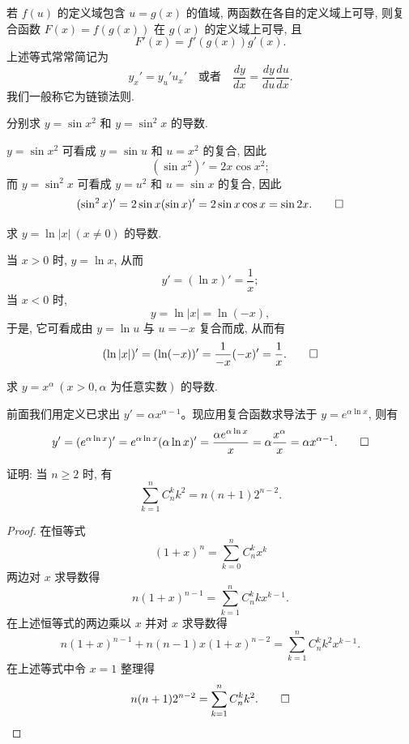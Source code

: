 \begin{remark}\label{remark:ma-4-source-36}
若 $f(u)$ 的定义域包含 $u=g(x)$ 的值域, 两函数在各自的定义域上可导, 则复合函数 $F(x)=f(g(x))$ 在 $g(x)$ 的定义域上可导, 且
\[
  F'(x)=f'(g(x))g'(x).
\]
上述等式常常简记为
\[
  y_x'=y_u'u_x'
  \quad\text{或者}\quad
  \frac{dy}{dx}=\frac{dy}{du}\frac{du}{dx}.
\]
我们一般称它为链锁法则.
\end{remark}


\begin{example}\label{example:ma-4-2-5}
分别求 $y=\sin x^2$ 和 $y=\sin^2x$ 的导数.
\end{example}


\begin{solve}
$y=\sin x^2$ 可看成 $y=\sin u$ 和 $u=x^2$ 的复合, 因此
\[
  (\sin x^2)'=2x\cos x^2;
\]
而 $y=\sin^2x$ 可看成 $y=u^2$ 和 $u=\sin x$ 的复合, 因此
\[
  (\sin^2x)'=2\sin x(\sin x)'=2\sin x\cos x=\sin2x.
\qedhere
\]
\end{solve}


\begin{example}\label{example:ma-4-2-6}
求 $y=\ln|x|\ (x\ne0)$ 的导数.
\end{example}


\begin{solve}
当 $x>0$ 时, $y=\ln x$, 从而
\[
  y'=(\ln x)'=\frac1x;
\]
当 $x<0$ 时,
\[
  y=\ln|x|=\ln(-x),
\]
于是, 它可看成由 $y=\ln u$ 与 $u=-x$ 复合而成, 从而有
\[
  (\ln|x|)'=(\ln(-x))'=\frac1{-x}(-x)'=\frac1x.
\qedhere
\]
\end{solve}


\begin{example}\label{example:ma-4-2-7}
求 $y=x^\alpha\ (x>0,\alpha\text{ 为任意实数})$ 的导数.
\end{example}


\begin{solve}
前面我们用定义已求出 $y'=\alpha x^{\alpha-1}$。现应用复合函数求导法于 $y=e^{\alpha\ln x}$, 则有
\[
  y'=(e^{\alpha\ln x})'
  =
  e^{\alpha\ln x}(\alpha\ln x)'
  =
  \frac{\alpha e^{\alpha\ln x}}x
  =
  \alpha\frac{x^\alpha}x
  =
  \alpha x^{\alpha-1}.
\qedhere
\]
\end{solve}


\begin{example}\label{example:ma-4-2-8}
证明: 当 $n\geqslant2$ 时, 有
\[
  \sum_{k=1}^{n}C_n^kk^2=n(n+1)2^{n-2}.
\]
\end{example}


\begin{proof}
在恒等式
\[
  (1+x)^n=\sum_{k=0}^{n}C_n^kx^k
\]
两边对 $x$ 求导数得
\[
  n(1+x)^{n-1}=\sum_{k=1}^{n}C_n^kkx^{k-1}.
\]
在上述恒等式的两边乘以 $x$ 并对 $x$ 求导数得
\[
  n(1+x)^{n-1}+n(n-1)x(1+x)^{n-2}
  =
  \sum_{k=1}^{n}C_n^kk^2x^{k-1}.
\]
在上述等式中令 $x=1$ 整理得
\[
  n(n+1)2^{n-2}=\sum_{k=1}^{n}C_n^kk^2.
\qedhere
\]
\end{proof}


